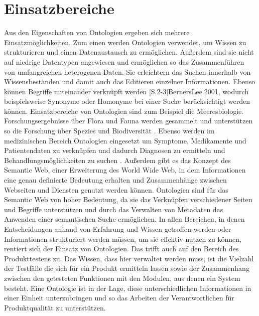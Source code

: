 \section{Einsatzbereiche}
Aus den Eigenschaften von Ontologien ergeben sich mehrere Einsatzmöglichkeiten. Zum einen werden Ontologien verwendet, um Wissen zu strukturieren und einen Datenaustausch zu ermöglichen. Außerdem sind sie nicht auf niedrige Datentypen angewiesen und ermöglichen so das Zusammenführen von umfangreichen heterogenen Daten. Sie erleichtern das Suchen innerhalb von Wissensbeständen und damit auch das Editieren einzelner Informationen. Ebenso können Begriffe miteinander verknüpft werden [S.2-3]{BernersLee.2001}, wodurch beispielsweise Synonyme oder Homonyme bei einer Suche berücksichtigt werden können.\newline
Einsatzbereiche von Ontologien sind zum Beispiel die Meeresbiologie. Forschungsergebnisse über Flora und Fauna werden gesammelt und unterstützen so die Forschung über Spezies und Biodiversität \cite{Garoufallou.2013}.
Ebenso werden im medizinischen Bereich Ontologien eingesetzt um Symptome, Medikamente und Patientendaten zu verknüpfen und dadurch Diagnosen zu ermitteln und Behandlungsmöglichkeiten zu suchen \cite{WolfgangHesse.2005}.\newline
Außerdem gibt es das Konzept des \glqq Semantic Web\grqq{}, einer Erweiterung des World Wide Web, in dem Informationen eine genau definierte Bedeutung erhalten und Zusammenhänge zwischen Webseiten und Diensten genutzt werden können.\cite[S.1]{BernersLee.2001} Ontologien sind für das \glqq Semantic Web\grqq{} von hoher Bedeutung, da sie das Verknüpfen verschiedener Seiten und Begriffe unterstützen und durch das Verwalten von Metadaten das Anwenden einer semantischen Suche ermöglichen.\cite[S.2-3]{BernersLee.2001} \newline
In allen Bereichen, in denen Entscheidungen anhand von Erfahrung und Wissen getroffen werden oder Informationen strukturiert werden müssen, um sie effektiv nutzen zu können, rentiert sich der Einsatz von Ontologien.\newline
Das trifft auch auf den Bereich des Produkttestens zu. Das Wissen, dass hier verwaltet werden muss, ist die Vielzahl der Testfälle die sich für ein Produkt ermitteln lassen sowie der Zusammenhang zwischen den getesteten Funktionen mit den Modulen, aus denen ein System besteht. Eine Ontologie ist in der Lage, diese unterschiedlichen Informationen in einer Einheit unterzubringen und so das Arbeiten der Verantwortlichen für Produktqualität zu unterstützen.
